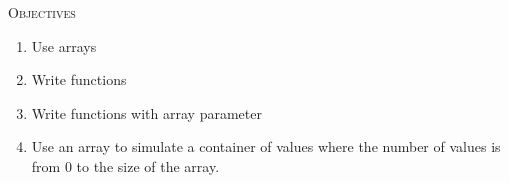 
\textsc{Objectives}
 \begin{enumerate}
   \item Use arrays
   \item Write functions
   \item Write functions with array parameter
   \item Use an array to simulate a container of values where the number of
         values is from $0$ to the size of the array.
 \end{enumerate}
\mbox{}\\
